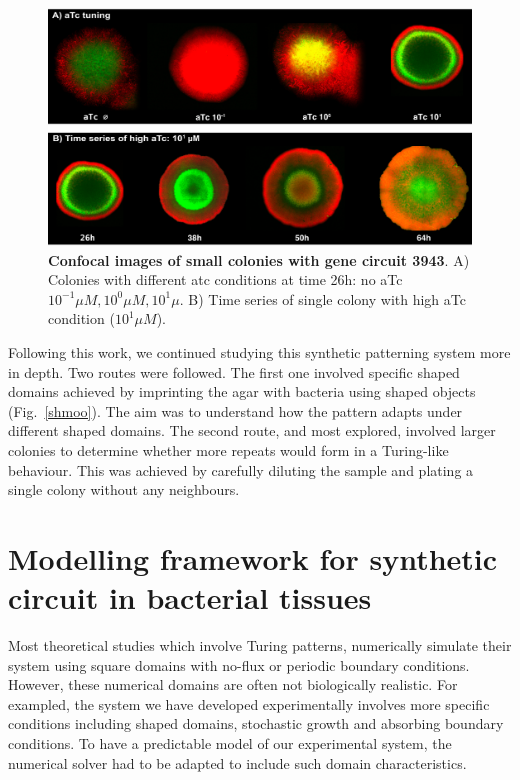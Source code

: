 \begin{figure}[H]

    \includegraphics[width=1\textwidth]{chapters/Chapter 3/atcwalk_timeseries_confocal}
    \caption{\textbf{Confocal images of small colonies with gene circuit 3943}. A) Colonies with different atc conditions at time 26h: no aTc $10^{-1} \mu M,10^{0} \mu M,10^{1} \mu  $. B) Time series of single colony with high aTc condition ($10^1 \mu M$).}
    \label{atcwalk_timeseries_confocal}
\end{figure}

Following this work, we continued studying this synthetic patterning system more in depth.
Two routes were followed.
The first one involved specific shaped domains achieved by imprinting the agar with bacteria using shaped objects (Fig.~\ref{shmoo}).
The aim was to understand how the pattern adapts under different shaped domains.
The second route, and most explored, involved larger colonies to determine whether more repeats would form in a Turing-like behaviour.
This was achieved by carefully diluting the sample and plating a single colony without any neighbours.

\section{Modelling framework for synthetic circuit in bacterial tissues}
Most theoretical studies which involve Turing patterns, numerically simulate their system using square domains with no-flux or periodic boundary conditions.
However, these numerical domains are often not biologically realistic.
For exampled, the system we have developed experimentally involves more specific conditions including shaped domains, stochastic growth and absorbing boundary conditions.
To have a predictable model of our experimental system, the numerical solver had to be adapted to include such domain characteristics.

